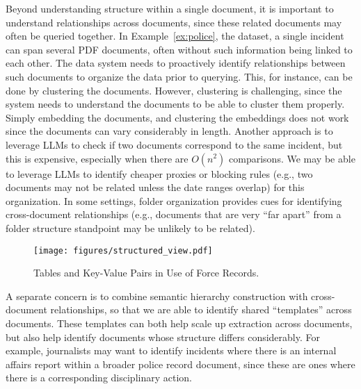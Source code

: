 Beyond understanding structure within a single document, 
it is important to understand relationships across documents,
since these related documents may often be queried together. 
In Example~\ref{ex:police}, the dataset, a single incident
can span several PDF documents, often without such information being linked to each other. 
The data system needs to proactively identify relationships 
between such documents to organize the data prior to querying. 
This, for instance, can be done by clustering the documents. 
However, clustering is challenging, since the system needs to understand
the documents to be able to cluster them properly.
Simply embedding the documents, and clustering the embeddings 
does not work since the documents can vary considerably in length.
Another approach is to leverage LLMs to check if two documents
correspond to the same incident, but this is expensive,
especially when there are $O(n^2)$ comparisons.
We may be able to leverage LLMs to identify cheaper proxies
or blocking rules (e.g., two documents
may not be related unless the date ranges overlap)
for this organization. 
In some settings, folder organization provides cues for identifying
cross-document relationships (e.g., documents that are very ``far apart''
from a folder structure standpoint may be unlikely to be related).



\begin{figure}[t]
    \centering
    \vspace{-20pt}
    \texttt{[image: figures/structured\_view.pdf]}
    \vspace{-10pt}
    \caption{Tables and Key-Value Pairs in Use of Force Records. 
    }
    \vspace{-10pt}

    \label{fig:force}
\end{figure}

A separate concern is to combine semantic hierarchy construction
with cross-document relationships, so that we are able
to identify shared ``templates'' across documents.
These templates can both help scale up extraction across
documents, but also help identify documents whose structure
differs considerably.
For example, journalists may want to identify incidents
where there is an internal affairs report within
a broader police record document,
since these are ones where there is a corresponding
disciplinary action. 

